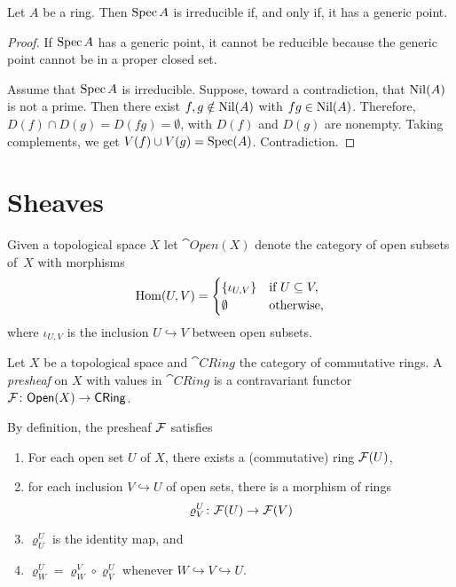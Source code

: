 \begin{prop}
    Let\/ $A$ be a ring. Then\/ $\operatorname{Spec} A$ is irreducible if, and only if, it has a generic point.
\end{prop}

\begin{proof}
    If $\operatorname{Spec} A$ has a generic point, it cannot be reducible because the generic point cannot be in a proper closed set.

    Assume that $\operatorname{Spec} A$ is irreducible. Suppose, toward a contradiction, that $\operatorname{Nil}(A)$ is not a prime. Then there exist $f,g\notin\operatorname{Nil}(A)$ with $fg\in\operatorname{Nil}(A)$. Therefore, $D(f)\cap D(g)=D(fg)=\emptyset$, with $D(f)$ and $D(g)$ are nonempty. Taking complements, we get $V(f)\cup V(g)=\operatorname{Spec}(A)$. Contradiction.
\end{proof}

\section{Sheaves}

Given a topological space $X$ let $\cat{Open}(X)$ denote the category of open subsets of~$X$ with morphisms
$$
    {\rm Hom}(U,V) = \begin{cases}
        \{\iota_{U,V}\}    &\text{if }U\subseteq V,\\
        \emptyset   &\text{otherwise},
    \end{cases}
$$
where $\iota_{U,V}$ is the inclusion $U\hookrightarrow V$ between open subsets.

\begin{defn}
    Let $X$ be a topological space and $\cat{CRing}$ the category of commutative rings. A \textsl{presheaf} on $X$ with values in $\cat{CRing}$ is a contravariant functor $\mathcal{F}\colon\mathsf{Open}(X)\to\mathsf{CRing}$.
\end{defn}
    
\begin{rem}
    By definition, the presheaf $\mathcal{F}$ satisfies
    \begin{enumerate}[\rm i)]
        \item For each open set $U$ of $X$, there exists a (commutative) ring $\mathcal{F}(U)$,
        \item for each inclusion $V \hookrightarrow U$ of open sets, there is a morphism of rings
        $$
        \varrho_V^U\colon\mathcal{F}(U)\to\mathcal{F}(V)
        $$
        \item $\varrho_U^U$ is the identity map, and
        \item $\varrho^U_W = \varrho^V_W\circ\varrho^U_V$ whenever $W \hookrightarrow V \hookrightarrow U$.
    \end{enumerate}    
\end{rem}

